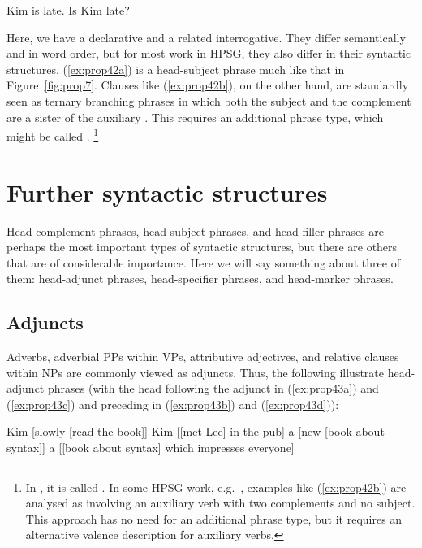 \documentclass[output=paper
	        ,collection
	        ,collectionchapter
 	        ,biblatex
                ,babelshorthands
                ,newtxmath
                ,draftmode
                ,colorlinks, citecolor=brown
]{langscibook}
\begin{document}
\eal\label{ex:prop42}
\ex\label{ex:prop42a}
Kim is late.
\ex\label{ex:prop42b}
Is Kim late?
\zl

\noindent
Here, we have a declarative and a related interrogative. They differ semantically and in word order, but for most work in HPSG, they also differ in their syntactic structures. (\ref{ex:prop42a}) is a head-subject phrase much like that in Figure~\ref{fig:prop7}. Clauses like (\ref{ex:prop42b}), on the other hand, are standardly seen as ternary branching phrases in which both the subject and the complement are a sister of the auxiliary \citep[40]{ps2}. This requires an additional phrase type, which might be called .%
%
\footnote{In \citet[36]{GSag2000a-u}, it is called . In some HPSG work, e.g.\ \citet[409--414]{SWB2003a}, examples like (\ref{ex:prop42b}) are analysed as involving an auxiliary verb with two complements and no subject. This approach has no need for an additional phrase type, but it requires an alternative valence description for auxiliary verbs.}
%


\section{Further syntactic structures}\label{sec:prop6}
\label{prop:sec-further-syntactic-structures}

Head-complement phrases, head-subject phrases, and head-filler phrases are perhaps the most important types of syntactic structures, but there are others that are of considerable importance. Here we will say something about three of them: head-adjunct phrases, head-specifier phrases, and head-marker phrases.

\subsection{Adjuncts}\label{sec:prop6.1}

Adverbs, adverbial PPs within VPs, attributive adjectives, and relative clauses within NPs are commonly viewed as adjuncts. Thus, the following illustrate head-adjunct phrases (with the head following the adjunct in (\ref{ex:prop43a}) and (\ref{ex:prop43c}) and preceding in (\ref{ex:prop43b}) and (\ref{ex:prop43d})):

\eal\label{ex:prop43}
\ex\label{ex:prop43a}
Kim [slowly [read the book]]
\ex\label{ex:prop43b}
Kim [[met Lee] in the pub]
\ex\label{ex:prop43c}
a [new [book about syntax]]
\ex\label{ex:prop43d}\label{ex-book-which-impresses}
a [[book about syntax] which impresses everyone]
\zl
\end{document}
